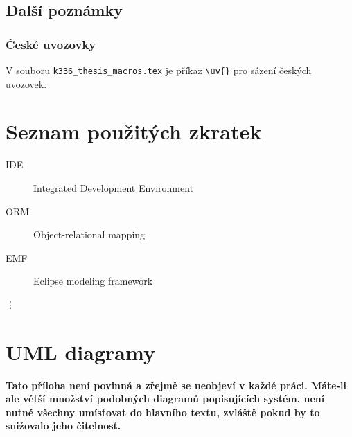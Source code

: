 \documentclass[11pt,twoside,a4paper]{book}
\begin{document}
\section{Další poznámky}
\subsection{České uvozovky}
V souboru \verb|k336_thesis_macros.tex| je příkaz \verb|\uv{}| pro sázení českých uvozovek. 


\chapter{Seznam použitých zkratek}

\begin{description}
\item[IDE] Integrated Development Environment
\item[ORM] Object-relational mapping
\item[EMF] Eclipse modeling framework
\end{description}
\vdots

\chapter{UML diagramy}
\textbf{\large Tato příloha není povinná a zřejmě se neobjeví v každé práci. Máte-li ale větší množství podobných diagramů popisujících systém, není nutné všechny umísťovat do hlavního textu, zvláště pokud by to snižovalo jeho čitelnost.}

\end{document}
